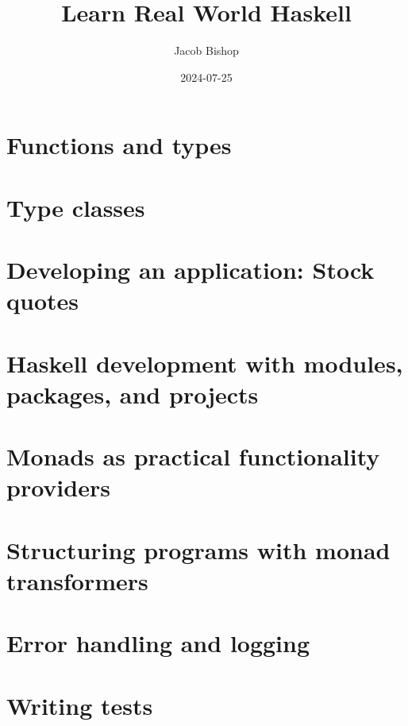 \documentclass[UTF8]{ctexart}
\title{Learn Real World Haskell}
\author{Jacob Bishop}
\date{2024-07-25}
\begin{document}
\maketitle
\newpage

\section{Functions and types}

\newpage

\section{Type classes}

\newpage

\section{Developing an application: Stock quotes}

\newpage

\section{Haskell development with modules, packages, and projects}

\newpage

\section{Monads as practical functionality providers}

\newpage

\section{Structuring programs with monad transformers}

\newpage

\section{Error handling and logging}

\newpage

\section{Writing tests}

\newpage
\end{document}
